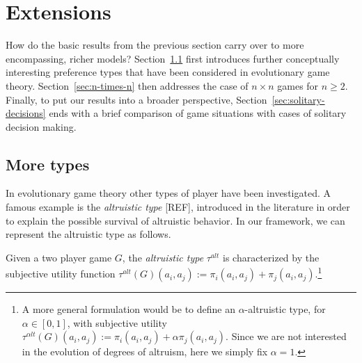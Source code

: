 \documentclass[fleqn,reqno,11pt]{article}
\begin{document}
\section{Extensions}
\label{sec:extensions}

How do the basic results from the previous section carry over to more encompassing, richer
models? Section~\ref{sec:more-types} first introduces further conceptually interesting
preference types that have been considered in evolutionary game theory. Section~\ref{sec:n-times-n}
then addresses the case of $n \times n$ games for $n \ge 2$. Finally, to put our results into
a broader perspective, Section~\ref{sec:solitary-decisions} ends with a brief comparison of
game situations with cases of solitary decision making.

\subsection{More types}
\label{sec:more-types}


In evolutionary game theory other types of player have been investigated. A famous example is the \textit{altruistic type} [REF], introduced in the literature in order to explain the possible survival of altruistic behavior. In our framework, we can represent the altruistic type as follows. 


\iffalse

\begin{definition}[Altruistic preference] \label{defn:altpref}

For a game $ G=\langle N, (A_i , \pi_i)_{i \in N} \rangle $, we define the altruistic preference $ \theta^{alt}: A \rightarrow \mathbb{R} $ such that $ \theta^{alt}(a_i,a_{-i})=\pi(a_i,a_{-i}) + \sum_{j \neq i} \pi(a_{j},a_{-j})$.\footnote{A more general formulation [see: REFERENCES] would be to define an $ \alpha$-altruistic type, for $\alpha \in [0,1]$, with subjective utility $ \theta^{\alpha lt}(a_i,a_{-i})=\pi(a_i,a_{-i}) + \alpha \sum_{j \neq i} \pi(a_{j},a_{-j})$. Since we are not interested in the evolution of degrees of altruism here, we simply fix $ \alpha = 1 $.}

\end{definition}

\fi

\begin{definition} \label{defn:alttype}

Given a two player game  $ G $, the \textit{altruistic type} $\tau^{alt}$ is characterized by the subjective utility function $\tau^{alt}(G)(a_i, a_j):=\pi_i(a_i,a_j) + \pi_j(a_i,a_j)$.\footnote{A more general formulation would be to define an $ \alpha$-altruistic type, for $\alpha \in [0,1]$, with subjective utility $ \tau^{\alpha lt}(G)(a_i, a_j):=\pi_i(a_i,a_j) + \alpha \pi_j(a_i,a_j)$. Since we are not interested in the evolution of degrees of altruism, here we simply fix $ \alpha = 1 $.}

\end{definition}
\end{document}
